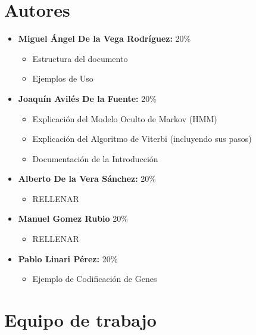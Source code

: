 \documentclass[11pt,openany]{book}
\begin{document}
\tableofcontents %
\newpage %


\chapter{Autores}
\begin{itemize}
      \item \textbf{Miguel Ángel De la Vega Rodríguez:} 20\%
            \begin{itemize}
                  \item Estructura del documento
                  \item Ejemplos de Uso
            \end{itemize}
      \item \textbf{Joaquín Avilés De la Fuente:} 20\%
            \begin{itemize}
                  \item Explicación del Modelo Oculto de Markov (HMM)
                  \item Explicación del Algoritmo de Viterbi (incluyendo sus pasos)
                  \item Documentación de la Introducción
            \end{itemize}
      \item \textbf{Alberto De la Vera Sánchez: } 20\%
            \begin{itemize}
                  \item RELLENAR
            \end{itemize}
      \item \textbf{Manuel Gomez Rubio} 20\%
            \begin{itemize}
                \item RELLENAR
            \end{itemize}
      \item \textbf{Pablo Linari Pérez:} 20\%
            \begin{itemize}
                  \item Ejemplo de Codificación de Genes
            \end{itemize}
\end{itemize}

\chapter{Equipo de trabajo}
\end{document}
